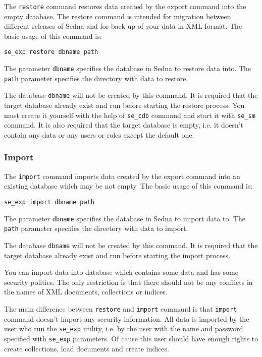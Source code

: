 \documentclass[a4paper,12pt]{article}
\begin{document}
The \verb!restore! command restores data created by the export command into the
empty database. The restore command is intended for migration between different
releases of Sedna and for back up of your data in XML format. The basic usage of
this command is:

\begin{verbatim}
se_exp restore dbname path
\end{verbatim}

The parameter \verb!dbname! specifies the database in Sedna to restore data
into. The \verb!path! parameter specifies the directory with data to restore.

The database \verb!dbname! will not be created by this command. It is required
that the target database already exist and run before starting the restore
process. You must create it yourself with the help of \verb!se_cdb! command and
start it with \verb!se_sm! command. It is also required that the target database
is empty, i.e. it doesn't contain any data or any users or roles except the
default one.


\subsubsection*{Import}

The \verb!import! command imports data created by the export command into an
existing database which may be not empty. The basic usage of this command is:

\begin{verbatim}
se_exp import dbname path
\end{verbatim}

The parameter \verb!dbname! specifies the database in Sedna to import data to.
The \verb!path! parameter specifies the directory with data to import.

The database \verb!dbname! will not be created by this command. It is required
that the target database already exist and run before starting the import
process.

You can import data into database which contains some data and has some security
politics. The only restriction is that there should not be any conflicts in the
names of XML documents, collections or indices.

The main difference between \verb!restore! and \verb!import! command is that
\verb!import! command doesn't import any security information. All data is
imported by the user who run the \verb!se_exp! utility, i.e. by the user with
the name and password specified with \verb!se_exp! parameters. Of cause this
user should have enough rights to create collections, load documents and create
indices.
\end{document}
